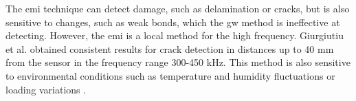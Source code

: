 The \ac{emi} technique can detect damage, such as delamination or cracks, but is also sensitive to changes, such as weak bonds, which the \ac{gw} method is ineffective at detecting.
However, the \ac{emi} is a local method for the high frequency.
Giurgiutiu et al. \cite{giurgiutiu2001electro} obtained consistent results for crack detection in distances up to 40 \unit{\mm} from the sensor in the frequency range 300-450 \unit{\kHz}. 
This method is also sensitive to environmental conditions such as temperature and humidity fluctuations\cite{bhalla2002practical} or loading variations \cite{lim2011impedance}.

